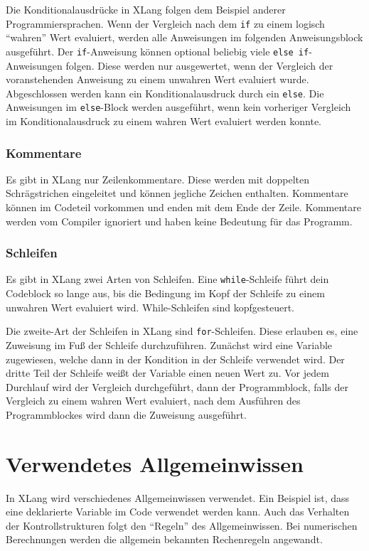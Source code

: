 \documentclass[a4paper]{article}
\begin{document}
Die Konditionalausdrücke in XLang folgen dem Beispiel anderer Programmiersprachen.
Wenn der Vergleich nach dem \texttt{if} zu einem logisch \enquote{wahren} Wert evaluiert, werden
alle Anweisungen im folgenden Anweisungsblock ausgeführt.
Der \texttt{if}-Anweisung können optional beliebig viele \texttt{else if}-Anweisungen folgen.
Diese werden nur ausgewertet, wenn der Vergleich der voranstehenden Anweisung zu einem unwahren Wert
evaluiert wurde.
Abgeschlossen werden kann ein Konditionalausdruck durch ein \texttt{else}. Die Anweisungen im
\texttt{else}-Block werden ausgeführt, wenn kein vorheriger Vergleich im Konditionalausdruck zu
einem wahren Wert evaluiert werden konnte.

\subsubsection{Kommentare}

Es gibt in XLang nur Zeilenkommentare. Diese werden mit doppelten Schrägstrichen eingeleitet und
können jegliche Zeichen enthalten.
Kommentare können im Codeteil vorkommen und enden mit dem Ende der Zeile.
Kommentare werden vom Compiler ignoriert und haben keine Bedeutung für das Programm.

\subsubsection{Schleifen}

Es gibt in XLang zwei Arten von Schleifen. Eine \texttt{while}-Schleife führt dein Codeblock so
lange aus, bis die Bedingung im Kopf der Schleife zu einem unwahren Wert evaluiert wird.
While-Schleifen sind kopfgesteuert.

Die zweite-Art der Schleifen in XLang sind \texttt{for}-Schleifen. Diese erlauben es, eine Zuweisung
im Fuß der Schleife durchzuführen. Zunächst wird eine Variable zugewiesen, welche dann in der
Kondition in der Schleife verwendet wird. Der dritte Teil der Schleife weißt der Variable einen
neuen Wert zu. Vor jedem Durchlauf wird der Vergleich durchgeführt, dann der Programmblock, falls
der Vergleich zu einem wahren Wert evaluiert, nach dem Ausführen des Programmblockes wird dann die
Zuweisung ausgeführt.


\section{Verwendetes Allgemeinwissen}

In XLang wird verschiedenes Allgemeinwissen verwendet.
Ein Beispiel ist, dass eine deklarierte Variable im Code verwendet werden kann.
Auch das Verhalten der Kontrollstrukturen folgt den \enquote{Regeln} des Allgemeinwissen.
Bei numerischen Berechnungen werden die allgemein bekannten Rechenregeln angewandt.
\end{document}
